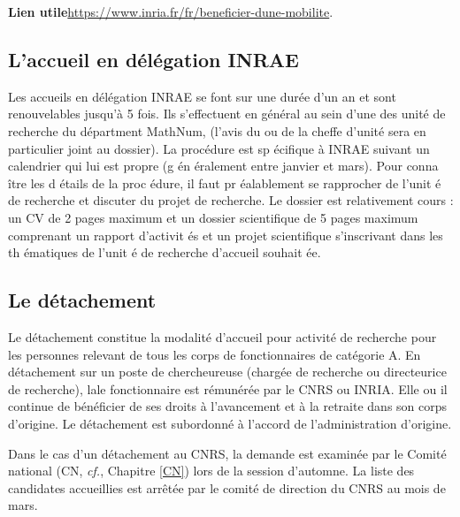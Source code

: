 \vspace{-.5\baselineskip}
\textbf{Lien utile\hspace{0.5em}}\url{https://www.inria.fr/fr/beneficier-dune-mobilite}.

\subsection*{L'accueil en d\'el\'egation INRAE}

Les accueils en d\'el\'egation INRAE se font sur une dur\'ee d'un an et sont renouvelables jusqu'à 5 fois. Ils s'effectuent en
g\'en\'eral au sein d'une des unit\'e de recherche du d\'epartment MathNum, 
(l'avis du ou de la chef\mp fe d'unit\'e sera en particulier joint au dossier). La proc\'edure est sp \'ecifique à INRAE suivant un calendrier qui lui est propre (g \'en \'eralement entre janvier et mars). Pour conna \^itre les d \'etails de la proc \'edure, il faut pr \'ealablement se rapprocher de l'unit \'e de recherche et discuter du projet de recherche. Le dossier est relativement cours : un CV de 2 pages maximum et un dossier scientifique de 5 pages maximum comprenant un rapport d'activit \'es et un projet scientifique s'inscrivant dans les th \'ematiques de l'unit \'e de recherche d'accueil souhait \'ee.


\subsection{Le d\'etachement}
\label{detachement}


Le d\'etachement constitue la modalit\'e d'accueil pour activit\'e
de recherche pour les personnes relevant de tous les corps de
fonctionnaires de cat\'egorie A. En d\'etachement sur un poste de
chercheur\mp euse (charg\'e\mp e de recherche ou directeur\mp ice de recherche), la\mp le
fonctionnaire est r\'emun\'er\'e\mp e par le CNRS ou INRIA. Elle ou il continue
de b\'en\'eficier de ses droits \`a l'avancement et \`a la retraite
dans son corps d'origine. Le d\'etachement est subordonn\'e \`a
l'accord de l'administration d'origine.

Dans le cas d'un d\'etachement au CNRS, la demande est examin\'ee
par le Comit\'e national (CN, {\em cf.}, Chapitre \ref{CN}) lors de la session
d'automne. La liste des candidat\mp e\mp s accueilli\mp e\mp s est arr\^et\'ee par le
comit\'e de direction du CNRS au mois de mars.

